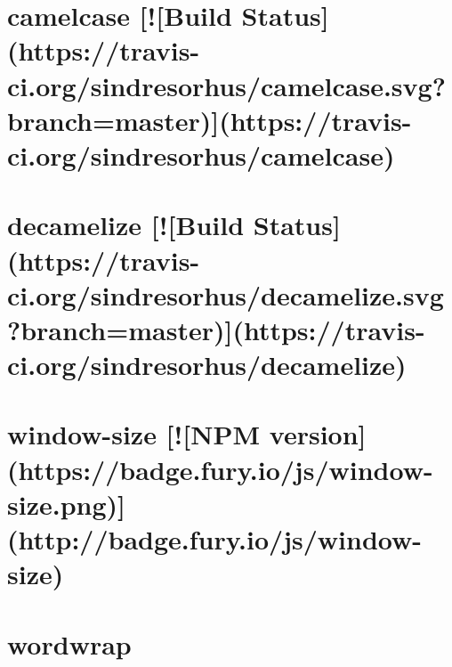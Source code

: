 \documentclass[twoside]{book}
\newcommand{\+}{\discretionary{\mbox{\scriptsize$\hookleftarrow$}}{}{}}
\begin{document}
\chapter{camelcase \mbox{[}!\mbox{[}Build Status\mbox{]}(https\+://travis-\/ci.org/sindresorhus/camelcase.svg?branch=master)\mbox{]}(https\+://travis-\/ci.org/sindresorhus/camelcase)}
\label{md__c_1__users_martin__documents__git_hub_visual_studio__bachelor__wis_r__wis_r_node_modules_ist9c2401df6cced4ac8a451d0047d25193}
\hypertarget{md__c_1__users_martin__documents__git_hub_visual_studio__bachelor__wis_r__wis_r_node_modules_ist9c2401df6cced4ac8a451d0047d25193}{}

\chapter{decamelize \mbox{[}!\mbox{[}Build Status\mbox{]}(https\+://travis-\/ci.org/sindresorhus/decamelize.svg?branch=master)\mbox{]}(https\+://travis-\/ci.org/sindresorhus/decamelize)}
\label{md__c_1__users_martin__documents__git_hub_visual_studio__bachelor__wis_r__wis_r_node_modules_ist5a5d67e6c15d2e4e64145c1e0ec4dd96}
\hypertarget{md__c_1__users_martin__documents__git_hub_visual_studio__bachelor__wis_r__wis_r_node_modules_ist5a5d67e6c15d2e4e64145c1e0ec4dd96}{}

\chapter{window-\/size \mbox{[}!\mbox{[}N\+P\+M version\mbox{]}(https\+://badge.fury.\+io/js/window-\/size.png)\mbox{]}(http\+://badge.fury.\+io/js/window-\/size)}
\label{md__c_1__users_martin__documents__git_hub_visual_studio__bachelor__wis_r__wis_r_node_modules_istc1b2259f69652348dc0a077b9a453270}
\hypertarget{md__c_1__users_martin__documents__git_hub_visual_studio__bachelor__wis_r__wis_r_node_modules_istc1b2259f69652348dc0a077b9a453270}{}

\chapter{wordwrap}
\label{md__c_1__users_martin__documents__git_hub_visual_studio__bachelor__wis_r__wis_r_node_modules_istdbef11c4f57f883c31569848007ceedf}
\hypertarget{md__c_1__users_martin__documents__git_hub_visual_studio__bachelor__wis_r__wis_r_node_modules_istdbef11c4f57f883c31569848007ceedf}{}

\end{document}
